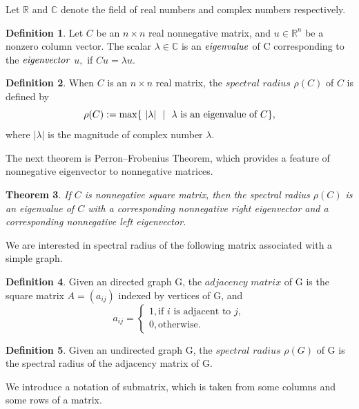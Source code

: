 \documentclass{article}
\theoremstyle{plain}
\newtheorem{thm}{Theorem}[section]
\theoremstyle{definition}
\newtheorem{defn}[thm]{Definition}
\begin{document}
Let $\mathbb{R}$ and $\mathbb{C}$ denote the
 field of real numbers and complex numbers respectively.

\begin{defn}       
Let $C$ be an $n \times n$ real nonnegative matrix, and $u \in \mathbb{R}^n$ be a
 nonzero column vector. The scalar $\lambda \in \mathbb{C}$ is an $\it{eigenvalue}$ 
of C corresponding to the $\it{eigenvector}$ $u,$  if $Cu = \lambda u.$
        

\end{defn}


\begin{defn} \cite{spec_rad}
    When $C$ is an $n \times n$ real matrix, the $\textit {spectral radius} $ $\rho(C)$
        of $C$ is defined by 
        $$\rho(C):=\max\{~|\lambda|~\ |~~\lambda\hbox{ is an eigenvalue of $C$}\},$$
    where $|\lambda|$ is the magnitude of complex number $\lambda.$
\end{defn}

    
The next theorem is Perron–Frobenius Theorem, which provides a feature of
 nonnegative eigenvector to nonnegative matrices.
\begin{thm} \cite{chang} \cite{prn_fros2} \label{thm:Perron_Frobenius}
    If $C$ is nonnegative square matrix, then the spectral radius $\rho(C)$ is an
    eigenvalue of $C$ with a corresponding nonnegative right eigenvector and a
    corresponding nonnegative left eigenvector.
\end{thm}

We are interested in spectral radius of the following matrix associated with a simple graph.

\begin{defn} 
    Given an directed graph G, the$\textit{ adjacency matrix}$ of G is the square 
    matrix $A = (a_{ij})$ indexed by vertices of G, and
     \[a_{ij} =\begin{cases} 
        1, \text{if $i$ is adjacent to $j$}, \\
        0, \text{otherwise.}
            \end{cases}
     \]
\end{defn}
    
\begin{defn}
Given an undirected graph G, the $\textit{spectral radius}$  $\rho(G) $ of G is the spectral
 radius of the adjacency matrix of G.
\end{defn}

    We introduce a notation of submatrix, which is taken from some columns and some rows of a
     matrix.
\end{document}

